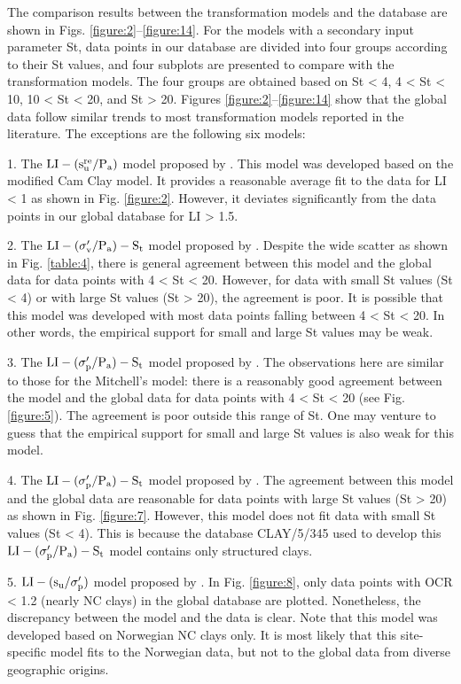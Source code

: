     {
        The comparison results between the transformation models and the database are shown in Figs. \ref{figure:2}–\ref{figure:14}. For the models with a secondary input parameter St, data points in our database are divided into four groups according to their St values, and four subplots are presented to compare with the transformation models. The four groups are obtained based on St < 4, 4 < St < 10, 10 < St < 20, and St > 20. Figures \ref{figure:2}–\ref{figure:14} show that the global data follow similar trends to most transformation models reported in the literature. The exceptions are the following six models:

        1. The $\rm{LI}-(s_u^{re}/P_a)$ model proposed by \citet{Wroth1978137}. This model was developed based on the modified Cam Clay model. It provides a reasonable average fit to the data for LI < 1 as shown in Fig. \ref{figure:2}. However, it deviates significantly from the data points in our global database for LI > 1.5.

        2. The $\rm{LI}-(\sigma_v'/P_a)-S_t$ model proposed by \citet{Mitchell1993}. Despite the wide scatter as shown in Fig. \ref{table:4}, there is general agreement between this model and the global data for data points with 4 < St < 20. However, for data with small St values (St < 4) or with large St values (St > 20), the agreement is poor. It is possible that this model was developed with most data points falling between 4 < St < 20. In other words, the empirical support for small and large St values may be weak.

        3. The $\rm{LI}-(\sigma_p'/P_a)-S_t$ model proposed by \citet{NAVFAC1982}. The observations here are similar to those for the Mitchell’s model: there is a reasonably good agreement between the model and the global data for data points with 4 < St < 20 (see Fig. \ref{figure:5}). The agreement is poor outside this range of St. One may venture to guess that the empirical support for small and large St values is also weak for this model.

        4. The $\rm{LI}-(\sigma_p'/P_a)-S_t$ model proposed by \citet{Ching2012522}. The agreement between this model and the global data are reasonable for data points with large St values (St > 20) as shown in Fig. \ref{figure:7}. However, this model does not fit data with small St values (St < 4). This is because the database CLAY/5/345 used to develop this $\rm{LI}-(\sigma_p'/P_a)-S_t$ model contains only structured clays.

        5. $\rm{LI}-(s_u/\sigma_p')$ model proposed by \citet{Bjerrum1960711}. In Fig. \ref{figure:8}, only data points with OCR < 1.2 (nearly NC clays) in the global database are plotted. Nonetheless, the discrepancy between the model and the data is clear. Note that this model was developed based on Norwegian NC clays only. It is most likely that this site-specific model fits to the Norwegian data, but not to the global data from diverse geographic origins.
        
}
